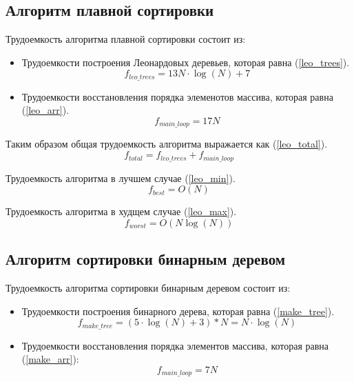 \subsection{Алгоритм плавной сортировки}

Трудоемкость алгоритма плавной сортировки состоит из:
\begin{itemize}
	\item Трудоемкости построения Леонардовых деревьев, которая равна (\ref{leo_trees}).
	\begin{equation}
		\label{leo_trees}
		f_{leo\_trees} = 13 N \cdot \log(N) + 7
	\end{equation}
	\item Трудоемкости восстановления порядка элеменотов массива, которая равна (\ref{leo_arr}).
	\begin{equation}
		\label{leo_arr}
		f_{main\_loop} = 17 N
	\end{equation}
\end{itemize}

Таким образом общая трудоемкость алгоритма выражается как (\ref{leo_total}).
\begin{equation}
	\label{leo_total}
	f_{total} = f_{leo\_trees} + f_{main\_loop}
\end{equation}

Трудоемкость алгоритма в лучшем случае (\ref{leo_min}).
\begin{equation}
	\label{leo_min}
	f_{best} = O(N)
\end{equation}

Трудоемкость алгоритма в худщем случае (\ref{leo_max}).
\begin{equation}
	\label{leo_max}
	f_{worst} = O(N\log(N))
\end{equation}



\subsection{Алгоритм сортировки бинарным деревом}

Трудоемкость алгоритма сортировки бинарным деревом состоит из:
\begin{itemize}
	\item Трудоемкости построения бинарного дерева, которая равна (\ref{make_tree}).
	\begin{equation}
		\label{make_tree}
		f_{make\_tree} = (5 \cdot \log(N) + 3) * N = N \cdot \log(N)
	\end{equation}
	\item Трудоемкости восстановления порядка элементов массива, которая равна (\ref{make_arr}):
	\begin{equation}
		\label{make_arr}
		f_{main\_loop} = 7 N
	\end{equation}
\end{itemize}

